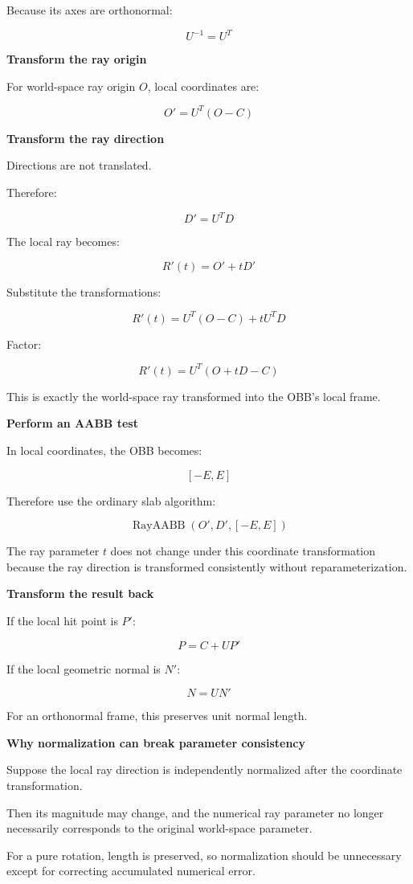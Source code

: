 Because its axes are orthonormal:

\[
U^{-1}=U^T
\]

\textbf{Transform the ray origin}

For world-space ray origin \(O\), local coordinates are:

\[
\boxed{ O'=U^T(O-C) }
\]

\textbf{Transform the ray direction}

Directions are not translated.

Therefore:

\[
\boxed{ D'=U^TD }
\]

The local ray becomes:

\[
R'(t)=O'+tD'
\]

Substitute the transformations:

\[
R'(t)=U^T(O-C)+tU^TD
\]

Factor:

\[
R'(t)=U^T(O+tD-C)
\]

This is exactly the world-space ray transformed into the OBB's local frame.

\textbf{Perform an AABB test}

In local coordinates, the OBB becomes:

\[
[-E,E]
\]

Therefore use the ordinary slab algorithm:

\[
\operatorname{RayAABB}(O',D',[-E,E])
\]

The ray parameter \(t\) does not change under this coordinate transformation because the ray direction is transformed consistently without reparameterization.

\textbf{Transform the result back}

If the local hit point is \(P'\):

\[
\boxed{ P=C+UP' }
\]

If the local geometric normal is \(N'\):

\[
\boxed{ N=UN' }
\]

For an orthonormal frame, this preserves unit normal length.

\textbf{Why normalization can break parameter consistency}

Suppose the local ray direction is independently normalized after the coordinate transformation.

Then its magnitude may change, and the numerical ray parameter no longer necessarily corresponds to the original world-space parameter.

For a pure rotation, length is preserved, so normalization should be unnecessary except for correcting accumulated numerical error.

